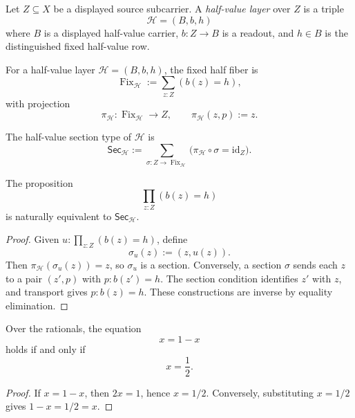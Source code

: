 \begin{definition}
\label{def:layered-projection-half-value-layer}
Let $Z\subseteq X$ be a displayed source subcarrier. A \emph{half-value
layer} over $Z$ is a triple
$$
\mathcal H=(B,b,h)
$$
where $B$ is a displayed half-value carrier, $b:Z\to B$ is a readout, and
$h\in B$ is the distinguished fixed half-value row.
\end{definition}

\begin{definition}
\label{def:layered-projection-fixed-half-fiber}
For a half-value layer $\mathcal H=(B,b,h)$, the fixed half fiber is
$$
\operatorname{Fix}_{\mathcal H}
:=
\sum_{z:Z}(b(z)=h),
$$
with projection
$$
\pi_{\mathcal H}:\operatorname{Fix}_{\mathcal H}\to Z,
\qquad
\pi_{\mathcal H}(z,p):=z.
$$
\end{definition}

\begin{definition}
\label{def:layered-projection-half-value-section}
The half-value section type of $\mathcal H$ is
$$
\mathsf{Sec}_{\mathcal H}
:=
\sum_{\sigma:Z\to\operatorname{Fix}_{\mathcal H}}
\bigl(\pi_{\mathcal H}\circ\sigma=\mathrm{id}_{Z}\bigr).
$$
\end{definition}

\begin{theorem}
\label{thm:layered-projection-half-value-propositions-sections}
The proposition
$$
\prod_{z:Z}(b(z)=h)
$$
is naturally equivalent to $\mathsf{Sec}_{\mathcal H}$.
\end{theorem}

\begin{proof}
Given $u:\prod_{z:Z}(b(z)=h)$, define
$$
\sigma_u(z):=(z,u(z)).
$$
Then $\pi_{\mathcal H}(\sigma_u(z))=z$, so $\sigma_u$ is a section.
Conversely, a section $\sigma$ sends each $z$ to a pair $(z',p)$ with
$p:b(z')=h$. The section condition identifies $z'$ with $z$, and
transport gives $p:b(z)=h$. These constructions are inverse by equality
elimination.
\end{proof}

\begin{theorem}
\label{thm:layered-projection-half-fixed-point}
Over the rationals, the equation
$$
x=1-x
$$
holds if and only if
$$
x=\frac12.
$$
\end{theorem}

\begin{proof}
If $x=1-x$, then $2x=1$, hence $x=1/2$. Conversely, substituting
$x=1/2$ gives $1-x=1/2=x$.
\end{proof}

